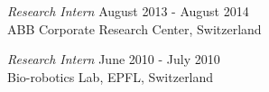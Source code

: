 \documentclass[margin, 10pt]{res} %
\begin{document}
\begin{resume}
{\sl Research Intern} \hfill August 2013 - August 2014 \\
ABB Corporate Research Center, Switzerland

{\sl Research Intern}  \hfill June 2010 - July 2010 \\
Bio-robotics Lab, EPFL, Switzerland




\end{resume}
\end{document}
